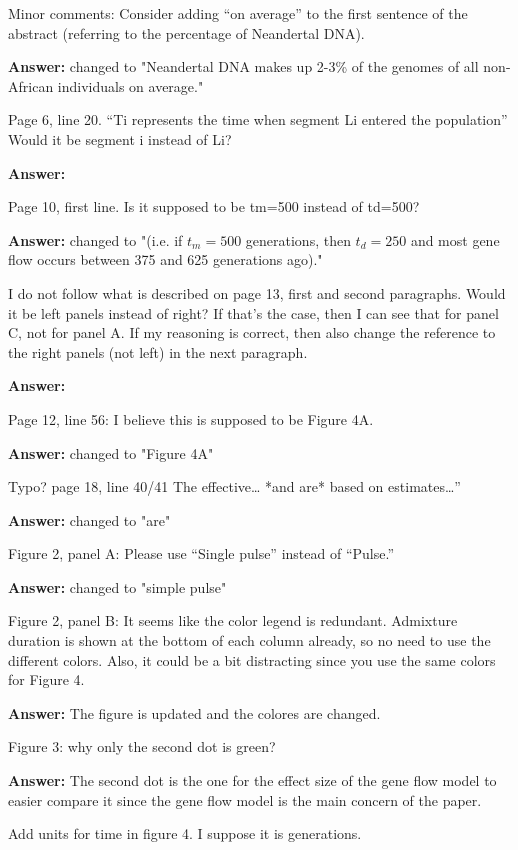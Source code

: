 \documentclass[11pt]{article}
\begin{document}
Minor comments:
Consider adding “on average” to the first sentence of the abstract (referring to the percentage of Neandertal DNA).

\textbf{Answer:} changed to "Neandertal DNA makes up 2-3\% of the genomes of all non-African individuals on average."

Page 6, line 20. “Ti represents the time when segment Li entered the population” Would it be segment i instead of Li? 

\textbf{Answer:}

Page 10, first line. Is it supposed to be tm=500 instead of td=500?

\textbf{Answer:} changed to "(i.e. if $t_m= 500$ generations, then $t_d = 250$ and most gene flow occurs between  375 and 625
generations ago)."


I do not follow what is described on page 13, first and second paragraphs. Would it be left panels instead of right? If that’s the case, then I can see that for panel C, not for panel A. If my reasoning is correct, then also change the reference to the right panels (not left) in the next paragraph.

\textbf{Answer:} 

Page 12, line 56: I believe this is supposed to be Figure 4A. 

\textbf{Answer:} changed to "Figure 4A"

Typo? page 18, line 40/41 The effective… *and are* based on estimates…” 

\textbf{Answer:} changed to "are"

Figure 2, panel A: Please use “Single pulse” instead of “Pulse.”

\textbf{Answer:} changed to "simple pulse"


Figure 2, panel B: It seems like the color legend is redundant. Admixture duration is shown at the bottom of each column already, so no need to use the different colors. Also, it could be a bit distracting since you use the same colors for Figure 4. 

\textbf{Answer:} The figure is updated and the colores are changed.

Figure 3: why only the second dot is green?

\textbf{Answer:} The second dot is the one for the effect size of the gene flow model to easier compare it since the gene flow model is the main concern of the paper.

Add units for time in figure 4. I suppose it is generations.
\end{document}
